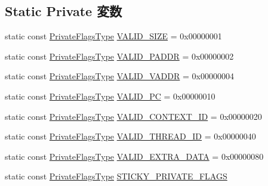 \subsection*{Static Private 変数}
\begin{DoxyCompactItemize}
\item 
static const \hyperlink{classRequest_ae45e5883b1d9912cc794fd219c392cc3}{PrivateFlagsType} \hyperlink{classRequest_ab877279328c94a99e08df0bef2dff5af}{VALID\_\-SIZE} = 0x00000001
\item 
static const \hyperlink{classRequest_ae45e5883b1d9912cc794fd219c392cc3}{PrivateFlagsType} \hyperlink{classRequest_a5f4f666e62b0ed0b438fe91d80967ee4}{VALID\_\-PADDR} = 0x00000002
\item 
static const \hyperlink{classRequest_ae45e5883b1d9912cc794fd219c392cc3}{PrivateFlagsType} \hyperlink{classRequest_a6df42589126b39ff720d5c4182485a1b}{VALID\_\-VADDR} = 0x00000004
\item 
static const \hyperlink{classRequest_ae45e5883b1d9912cc794fd219c392cc3}{PrivateFlagsType} \hyperlink{classRequest_a44bbdf4a07c092e4529a57ad18a64e9c}{VALID\_\-PC} = 0x00000010
\item 
static const \hyperlink{classRequest_ae45e5883b1d9912cc794fd219c392cc3}{PrivateFlagsType} \hyperlink{classRequest_ad48d87929617331987501ce65f540253}{VALID\_\-CONTEXT\_\-ID} = 0x00000020
\item 
static const \hyperlink{classRequest_ae45e5883b1d9912cc794fd219c392cc3}{PrivateFlagsType} \hyperlink{classRequest_a0d43d0eb62d8fc5de1f55f4912803a33}{VALID\_\-THREAD\_\-ID} = 0x00000040
\item 
static const \hyperlink{classRequest_ae45e5883b1d9912cc794fd219c392cc3}{PrivateFlagsType} \hyperlink{classRequest_ad22e050e916b79dee1057c45b2cc3d68}{VALID\_\-EXTRA\_\-DATA} = 0x00000080
\item 
static const \hyperlink{classRequest_ae45e5883b1d9912cc794fd219c392cc3}{PrivateFlagsType} \hyperlink{classRequest_ad84237c624fc4e6ee1465730b92b0a4f}{STICKY\_\-PRIVATE\_\-FLAGS}
\end{DoxyCompactItemize}


